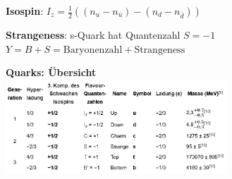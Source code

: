 \documentclass[10pt,twoside,a4paper]{article}
\begin{document}
\begin{multicols*}{3}
\textbf{Isospin}: $I_z = \frac{1}{2} \left( (n_u - n_{\bar{u}}) - (n_d - n_{\bar{d}}) \right)$

\textbf{Strangeness}: s-Quark hat Quantenzahl $S = -1$ \\
$Y = B+S = \text{Baryonenzahl} + \text{Strangeness}$


\textbf{Quarks: Übersicht}\\
\includegraphics[width=.33\textwidth, height=100pt]{tab_quark}

\end{multicols*}
\end{document}
